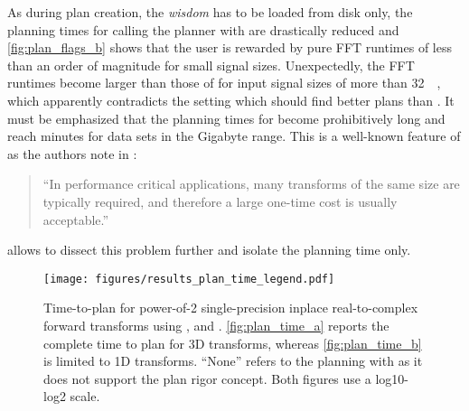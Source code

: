 As during plan creation, the \emph{wisdom} has to be loaded from disk only, the planning times for calling the planner with  are drastically reduced and \cref{fig:plan_flags_b} shows that the user is rewarded by pure FFT runtimes of less than an order of magnitude for small signal sizes. Unexpectedly, the FFT runtimes become larger than those of  for input signal sizes of more than \SI{32}{\kibi\byte}, which apparently contradicts the  setting which should find better plans than .
%
It must be emphasized that the planning times for  become prohibitively long and reach minutes for data sets in the Gigabyte range. This is a well-known feature of \fftw{} as the authors note in \cite{FFTW05}:
%
\begin{quote}
  ``In performance critical applications, many transforms of the same
  size are typically required, and therefore a large one-time cost is
  usually acceptable.''
\end{quote}
% 
\gearshifft{} allows to dissect this problem further and isolate the planning time only.
%
\begin{figure}[!tbp]
  \centering
  \texttt{[image: figures/results\_plan\_time\_legend.pdf]}\vspace{-1em}
  \hfill
  \caption{Time-to-plan for power-of-2 single-precision inplace real-to-complex forward transforms using \fftw{}, \cufft{} and \clfft{}. \cref{fig:plan_time_a} reports the complete time to plan for 3D transforms, whereas \cref{fig:plan_time_b} is limited to 1D transforms. ``None'' refers to the planning with \cufft{} as it does not support the plan rigor concept. Both figures use a log10-log2 scale.}
  \label{fig:plan_time}
\end{figure}
%
